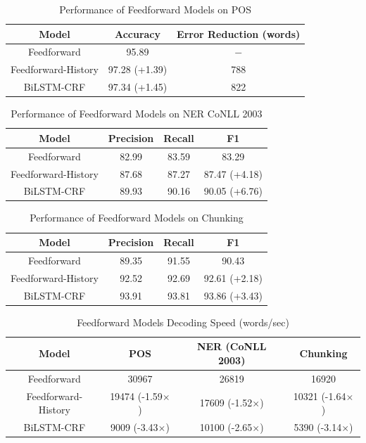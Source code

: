 \begin{table}[]
\centering
\caption{Performance of Feedforward Models on POS}
\label{table:ff-table1}
\begin{tabular}{|c|c|c|}
\hline
Model          & Accuracy       & Error Reduction (words)      \\ \hline
Feedforward    & 95.89          & $-$     \\ \hline
Feedforward-History & 97.28 (+1.39)    & 788 \\ \hline
BiLSTM-CRF & 97.34 (+1.45) & 822 \\ \hline
\end{tabular}
\end{table}

\begin{table}[]
\centering
\caption{Performance of Feedforward Models on NER CoNLL 2003}
\label{table:ff-table2}
\begin{tabular}{|c|c|c|c|}
\hline
Model          & Precision   & Recall   & F1 \\ \hline
Feedforward    & 82.99       & 83.59    & 83.29 \\ \hline
Feedforward-History & 87.68  & 87.27    & 87.47 (+4.18) \\ \hline
BiLSTM-CRF & 89.93 & 90.16 & 90.05 (+6.76) \\ \hline
\end{tabular}
\end{table}

\begin{table}[]
\centering
\caption{Performance of Feedforward Models on Chunking}
\label{table:ff-table3}
\begin{tabular}{|c|c|c|c|}
\hline
Model          & Precision   & Recall   & F1 \\ \hline
Feedforward    & 89.35       & 91.55    & 90.43 \\ \hline
Feedforward-History & 92.52  & 92.69    & 92.61 (+2.18) \\ \hline
BiLSTM-CRF & 93.91 & 93.81 & 93.86 (+3.43) \\ \hline
\end{tabular}
\end{table}

\begin{table}[]
\centering
\caption{Feedforward Models Decoding Speed (words/sec)}
\label{table:ff-tabel4}
\begin{tabular}{|c|c|c|c|}
\hline
Model       & POS & NER (CoNLL 2003) & Chunking     \\ \hline
Feedforward    & 30967     & 26819  &16920  \\ \hline
Feedforward-History & 19474 (-1.59$\times$) & 17609 (-1.52$\times$) & 10321 (-1.64$\times$)  \\ \hline
BiLSTM-CRF & 9009 (-3.43$\times$) & 10100 (-2.65$\times$) & 5390 (-3.14$\times$)\\ \hline
\end{tabular}
\end{table}


